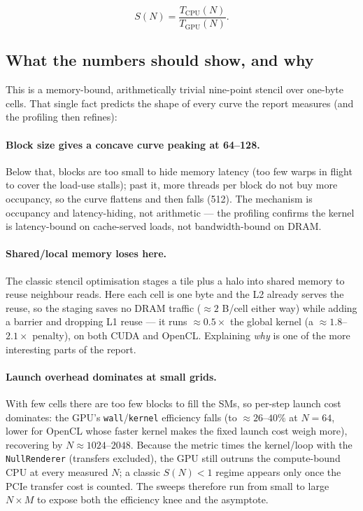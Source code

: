 \documentclass[
	english,
	letterpaper, oneside
]{article}
\begin{document}
\begin{equation}
	S(N) = \frac{T_{\text{CPU}}(N)}{T_{\text{GPU}}(N)}.
\end{equation}

\subsection{What the numbers should show, and why}

This is a memory-bound, arithmetically trivial nine-point stencil over one-byte
cells. That single fact predicts the shape of every curve the report measures
(and the profiling then refines):

\paragraph{Block size gives a concave curve peaking at 64--128.} Below
that, blocks are too small to hide memory latency (too few warps in flight to
cover the load-use stalls); past it, more threads per block do not buy more
occupancy, so the curve flattens and then falls (512). The mechanism is occupancy
and latency-hiding, not arithmetic --- the profiling confirms the kernel is
latency-bound on cache-served loads, not bandwidth-bound on DRAM.

\paragraph{Shared/local memory loses here.} The
classic stencil optimisation stages a tile plus a halo into shared memory to
reuse neighbour reads. Here each cell is one byte and the L2 already serves the
reuse, so the staging saves no DRAM traffic ($\approx 2$ B/cell either way) while
adding a barrier and dropping L1 reuse --- it runs $\approx 0.5\times$ the global
kernel (a $\approx 1.8$--$2.1\times$ penalty), on both CUDA and OpenCL. Explaining
\emph{why} is one of the more interesting parts of the report.

\paragraph{Launch overhead dominates at small grids.} With few cells there are too
few blocks to fill the SMs, so per-step launch cost dominates: the GPU's
\texttt{wall}/\texttt{kernel} efficiency falls (to $\approx 26$--$40\%$ at $N=64$,
lower for OpenCL whose faster kernel makes the fixed launch cost weigh more),
recovering by $N\approx 1024$--$2048$. Because the metric times the kernel/loop with
the \texttt{NullRenderer} (transfers excluded), the GPU still outruns the
compute-bound CPU at every measured $N$; a classic $S(N) < 1$ regime appears only
once the PCIe transfer cost is counted. The sweeps therefore run from small to large
$N\times M$ to expose both the efficiency knee and the asymptote.
\end{document}
